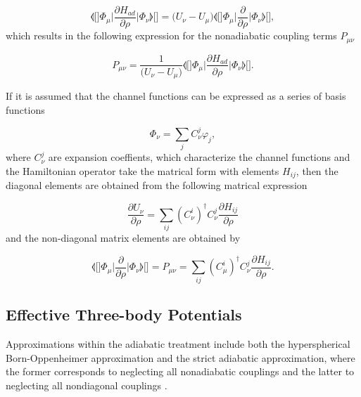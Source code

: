 \begin{equation}\label{derivaham}
\llangle[\bigg]  \Phi_{\mu}\bigg\lvert \frac{\partial H_{ad}}{\partial \rho} \bigg\rvert \Phi_{\nu} \rrangle[\bigg]= \big(U_{\nu}-U_{\mu}\big) \llangle[\bigg]  \Phi_{\mu} \bigg\lvert \frac{\partial}{\partial \rho} \bigg\rvert \Phi_{\nu} \rrangle[\bigg],
\end{equation}
which results in the following expression for the nonadiabatic coupling terms $P_{\mu \nu}$

\begin{equation}
P_{\mu \nu} = \frac{1}{\big(U_{\nu}-U_{\mu}\big)}\llangle[\bigg]  \Phi_{\mu} \bigg\lvert \frac{\partial H_{ad}}{\partial \rho} \bigg\rvert \Phi_{\nu}\rrangle[\bigg].
\end{equation}

If it is assumed that the channel functions can be expressed as a series of basis functions

\begin{equation}
\Phi_{\nu} = \sum_{j}C_{\nu}^j \varphi_j,
\end{equation} 
where $C_{\nu}^{j}$ are expansion coeffients, which characterize the channel functions and the Hamiltonian operator take the matrical form with elements $H_{ij}$, then the diagonal elements are obtained from the following matrical expression \cite{Sanz-Sanz}

\begin{equation}
\frac{\partial U_{\nu}}{\partial \rho} = \sum_{ij}(C_{\nu}^i)^{\dagger}C_{\nu}^j \frac{\partial H_{ij}}{\partial \rho}
\end{equation}
and the non-diagonal matrix elements are obtained by 

\begin{equation}
\llangle[\bigg]  \Phi_{\mu} \bigg\lvert \frac{\partial}{\partial \rho} \bigg\rvert \Phi_{\nu} \rrangle[\bigg] = P_{\mu \nu} = \sum_{ij}(C_{\mu}^i)^{\dagger}C_{\nu}^j \frac{\partial H_{ij}}{\partial \rho}.
\end{equation}


\subsection{Effective Three-body Potentials}
Approximations within the adiabatic treatment include both the hyperspherical Born-Oppenheimer approximation and the strict adiabatic approximation, where the former corresponds to neglecting all nonadiabatic couplings and the latter to neglecting all nondiagonal couplings \cite{Blume2002}. 


